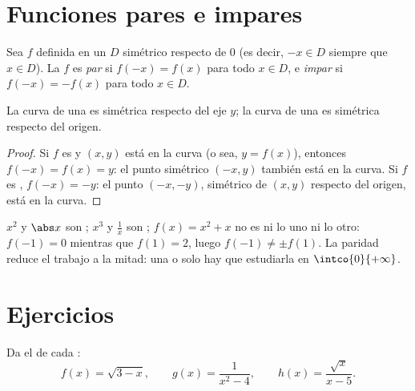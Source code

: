 \section{Funciones pares e impares}

\begin{definition}[Paridad]\label{def:g11:func:parity}
Sea $f$ definida en un  $D$ simétrico respecto de $0$ (es decir,
$-x \in D$ siempre que $x \in D$). La  $f$ es
\emph{par} si $f(-x) = f(x)$ para todo $x \in D$, e
\emph{impar} si $f(-x) = -f(x)$ para todo $x \in D$.
\end{definition}

\begin{proposition}\label{prop:g11:func:paritysym}
La curva de una  es simétrica respecto del eje $y$; la curva de
una  es simétrica respecto del origen.
\end{proposition}

\begin{proof}
Si $f$ es  y $(x, y)$ está en la curva (o sea, $y = f(x)$), entonces
$f(-x) = f(x) = y$: el punto simétrico $(-x, y)$ también está en la curva.
Si $f$ es , $f(-x) = -y$: el punto $(-x, -y)$, simétrico de $(x,y)$
respecto del origen, está en la curva.
\end{proof}

\begin{example}
$x^2$ y $\abs x$ son ; $x^3$ y $\frac1x$ son ;
$f(x) = x^2 + x$ no es ni lo uno ni lo otro: $f(-1) = 0$ mientras que
$f(1) = 2$, luego $f(-1) \neq \pm f(1)$. La paridad reduce el trabajo a la
mitad: una  o  solo hay que estudiarla en
$\intco{0}{+\infty}$.
\end{example}

\section{Ejercicios}

\begin{exercise}[$\star$]\label{exo:g11:func:1}
Da el  de cada :
\[
f(x) = \sqrt{3 - x}, \qquad
g(x) = \frac{1}{x^2 - 4}, \qquad
h(x) = \frac{\sqrt{x}}{x - 5} .
\]
\end{exercise}

